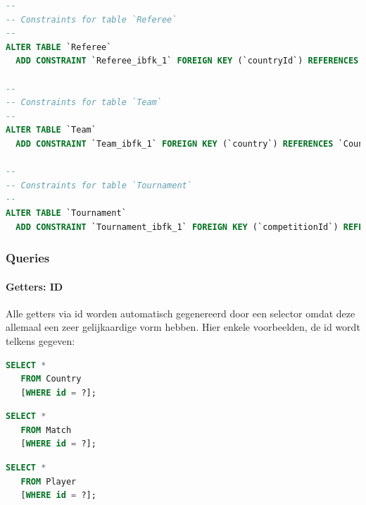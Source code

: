 \documentclass[11pt]{article}
\begin{document}
\begin{framed}
\begin{lstlisting}[language=sql]
--
-- Constraints for table `Referee`
--
ALTER TABLE `Referee`
  ADD CONSTRAINT `Referee_ibfk_1` FOREIGN KEY (`countryId`) REFERENCES `Country` (`id`);

--
-- Constraints for table `Team`
--
ALTER TABLE `Team`
  ADD CONSTRAINT `Team_ibfk_1` FOREIGN KEY (`country`) REFERENCES `Country` (`id`);

--
-- Constraints for table `Tournament`
--
ALTER TABLE `Tournament`
  ADD CONSTRAINT `Tournament_ibfk_1` FOREIGN KEY (`competitionId`) REFERENCES `Competition` (`id`);
     \end{lstlisting}
     \end{framed}








\subsubsection{Queries}


\paragraph{Getters: ID}

  Alle getters via id worden automatisch gegenereerd door een selector omdat deze allemaal een zeer gelijkaardige vorm hebben.
  Hier enkele voorbeelden, de id wordt telkens gegeven:

  \begin{framed}
  \begin{lstlisting}[language=sql]
  SELECT *
   FROM Country
   [WHERE id = ?];
  \end{lstlisting}
  \end{framed}

  \begin{framed}
  \begin{lstlisting}[language=sql]
  SELECT *
   FROM Match
   [WHERE id = ?];
  \end{lstlisting}
  \end{framed}

  \begin{framed}
  \begin{lstlisting}[language=sql]
  SELECT *
   FROM Player
   [WHERE id = ?];
  \end{lstlisting}
  \end{framed}
\end{document}
